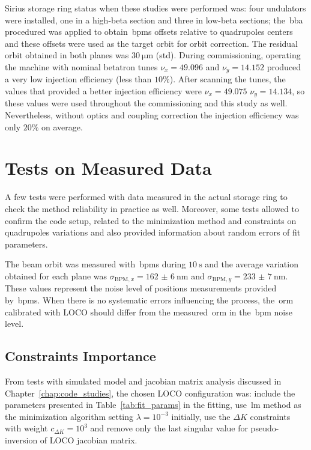 Sirius storage ring status when these studies were performed was: four undulators were installed, one in a high-beta section and three in low-beta sections; the~\gls{bba} procedured was applied to obtain~\glspl{bpm} offsets relative to quadrupoles centers and these offsets were used as the target orbit for orbit correction. The residual orbit obtained in both planes was $\SI{30}{\micro\meter}$ (\gls{std}). During commissioning, operating the machine with nominal betatron tunes $\nu_x = 49.096$ and $\nu_y = 14.152$ produced a very low injection efficiency (less than $10\%$). After scanning the tunes, the values that provided a better injection efficiency were $\nu_x = 49.075$ $\nu_y = 14.134$, so these values were used throughout the commissioning and this study as well. Nevertheless, without optics and coupling correction the injection efficiency was only $20\%$ on average.

\section{Tests on Measured Data}\label{sec:tests_measured}

A few tests were performed with data measured in the actual storage ring to check the method reliability in practice as well. Moreover, some tests allowed to confirm the code setup, related to the minimization method and constraints on quadrupoles variations and also provided information about random errors of fit parameters.

The beam orbit was measured with~\glspl{bpm} during $\SI{10}{\second}$ and the average variation obtained for each plane was $\sigma_{\mathrm{BPM}, x} = \SI{162(6)}{\nano\meter}$ and $\sigma_{\mathrm{BPM}, y} = \SI{233(7)}{\nano\meter}$. These values represent the noise level of positions measurements provided by~\glspl{bpm}. When there is no systematic errors influencing the process, the~\gls{orm} calibrated with LOCO should differ from the measured~\gls{orm} in the~\gls{bpm} noise level.

\subsection{Constraints Importance}\label{subsec:loco_config}
From tests with simulated model and jacobian matrix analysis discussed in Chapter~\ref{chap:code_studies}, the chosen LOCO configuration was: include the parameters presented in Table~\ref{tab:fit_params} in the fitting, use~\gls{lm} method as the minimization algorithm setting $\lambda = 10^{-3}$ initially, use the $\Delta K$ constraints with weight $c_{\Delta K} = 10^{3}$ and remove only the last singular value for pseudo-inversion of LOCO jacobian matrix. 

